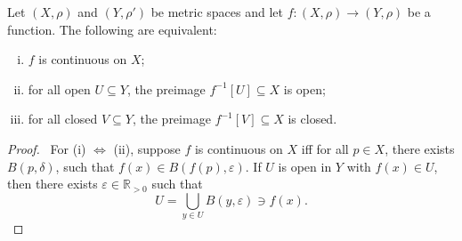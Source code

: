 \begin{lemma}
	Let $(X, \rho)$ and $(Y, \rho')$ be metric spaces and let $f: (X, \rho) \to (Y, \rho)$ be a function. The following are equivalent:
	\begin{enumerate}[(i)]
		\item $f$ is continuous on $X$;
		\item for all open $U \subseteq Y$, the preimage $f^{-1}[U] \subseteq X$ is open;
		\item for all closed $V \subseteq Y$, the preimage $f^{-1}[V] \subseteq X$ is closed.
	\end{enumerate}
\end{lemma}


\begin{proof} \ 
	For (i) $\iff$ (ii), suppose $f$ is continuous on $X$ iff for all $p \in X$, there exists $B(p, \delta)$, such that $f(x) \in B(f(p), \varepsilon)$. If $U$ is open in $Y$ with $f(x) \in U$, then there exists $\varepsilon \in \mathbb R_{> 0}$ such that
	$$
	U = \bigcup_{y \in U} B(y, \varepsilon) \ni f(x).
	$$
\end{proof}





























%